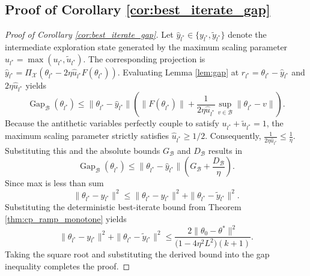 \documentclass[letter,11pt]{article}
\begin{document}
\subsection{Proof of Corollary \ref{cor:best_iterate_gap}}\label{sec:best_iterate_gap}
\begin{proof}[Proof of Corollary \ref{cor:best_iterate_gap}]
Let $\hat{y}_{l^*} \in \{y_{l^*}, \tilde{y}_{l^*}\}$ denote the intermediate exploration state generated by the maximum scaling parameter $\hat{u}_{l^*} = \max(u_{l^*}, \tilde{u}_{l^*})$. The corresponding projection is $\hat{y}_{l^*} = \Pi_{\mathcal{X}}(\theta_{l^*} - 2\eta \hat{u}_{l^*} F(\theta_{l^*}))$. Evaluating Lemma \ref{lem:gap} at $r_{l^*} = \theta_{l^*} - \hat{y}_{l^*}$ and $2\eta \hat{u}_{l^*}$ yields
\begin{equation}
\operatorname{Gap}_{\mathcal{B}}(\theta_{l^*}) \le \|\theta_{l^*} - \hat{y}_{l^*}\| \left( \|F(\theta_{l^*})\| + \frac{1}{2\eta \hat{u}_{l^*}} \sup_{v \in \mathcal{B}} \|\theta_{l^*} - v\| \right).
\end{equation}
Because the antithetic variables perfectly couple to satisfy $u_{l^*} + \tilde{u}_{l^*} = 1$, the maximum scaling parameter strictly satisfies $\hat{u}_{l^*} \ge 1/2$. Consequently, $\frac{1}{2\eta \hat{u}_{l^*}} \le \frac{1}{\eta}$. Substituting this and the absolute bounds $G_{\mathcal{B}}$ and $D_{\mathcal{B}}$ results in
\begin{equation}
\operatorname{Gap}_{\mathcal{B}}(\theta_{l^*}) \le \|\theta_{l^*} - \hat{y}_{l^*}\| \left( G_{\mathcal{B}} + \frac{D_{\mathcal{B}}}{\eta} \right).
\end{equation}
Since max is less than sum
\begin{equation}
\|\theta_{l^*} - \hat{y}_{l^*}\|^2 \le \|\theta_{l^*} - y_{l^*}\|^2 + \|\theta_{l^*} - \tilde{y}_{l^*}\|^2.
\end{equation}
Substituting the deterministic best-iterate bound from Theorem \ref{thm:cp_ramp_monotone} yields
\begin{equation}
\|\theta_{l^*} - y_{l^*}\|^2 + \|\theta_{l^*} - \tilde{y}_{l^*}\|^2 \le \frac{2\|\theta_0 - \theta^*\|^2}{\big(1 - 4\eta^2 L^2\big)(k+1)}.
\end{equation}
Taking the square root and substituting the derived bound into the gap inequality completes the proof.
\end{proof}
\end{document}
